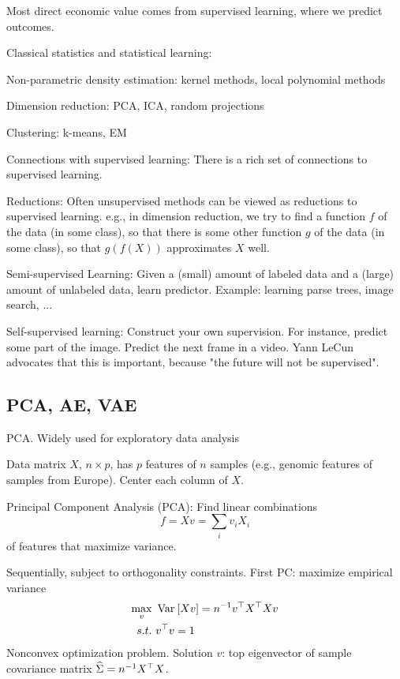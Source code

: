 \documentclass[english]{article}
\begin{document}
Most direct economic value comes from supervised learning, where we predict outcomes.


\item Classical statistics and statistical learning: 

Non-parametric density estimation: kernel methods, local polynomial methods

Dimension reduction: PCA, ICA, random projections

Clustering: k-means, EM


\item Connections with supervised learning: There is a rich set of connections to supervised learning. 

Reductions: Often unsupervised methods can be viewed as reductions to supervised learning. e.g., in dimension reduction, we try to find a function $f$ of the data (in some class), so that there is some other function $g$ of the data (in some class), so that $g(f(X))$ approximates $X$ well. 

Semi-supervised Learning: Given a (small) amount of labeled data and a (large) amount of unlabeled data, learn predictor. Example: learning parse trees, image search, ...

Self-supervised learning: Construct your own supervision. For instance, predict some part of the image. Predict the next frame in a video. Yann LeCun advocates that this is important, because "the future will not be supervised".

\eenum 

\subsection{PCA, AE, VAE}


\benum
\item PCA. Widely used for exploratory data analysis


Data matrix $X$, $n \times p$, has $p$ features of $n$ samples (e.g., genomic features of samples from Europe). Center each column of $X$.

Principal Component Analysis (PCA): Find linear combinations 
$$f = Xv = \sum_i v_i X_i$$ 
of features that maximize variance. 


Sequentially, subject to orthogonality constraints. First PC: maximize empirical variance 
\begin{align*}
\max_v\,\,  &\operatorname{Var}_{}\left[Xv\right] = n^{-1} v^\top X^\top Xv\\
s.t.\,\,&v^\top v=1
\end{align*}
Nonconvex optimization problem. Solution $v$: top eigenvector of sample covariance matrix $\widehat{\Sigma} = n^{-1} X^\top X$.
\end{document}
